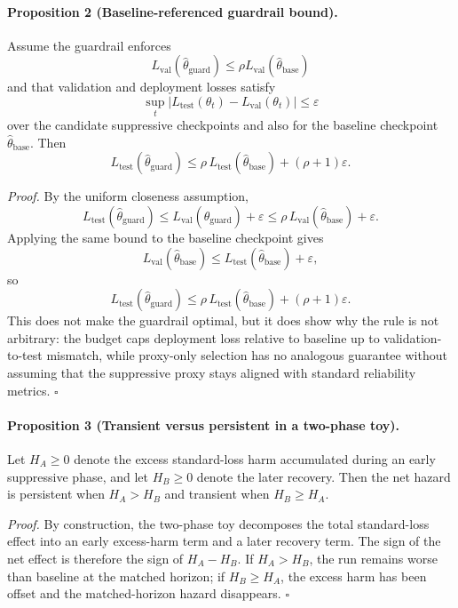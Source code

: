 \paragraph{Proposition 2 (Baseline-referenced guardrail bound).}
Assume the guardrail enforces
\[
L_{\mathrm{val}}(\hat\theta_{\mathrm{guard}}) \le \rho L_{\mathrm{val}}(\hat\theta_{\mathrm{base}})
\]
and that validation and deployment losses satisfy
\[
\sup_t \left|L_{\mathrm{test}}(\theta_t)-L_{\mathrm{val}}(\theta_t)\right| \le \varepsilon
\]
over the candidate suppressive checkpoints and also for the baseline checkpoint $\hat\theta_{\mathrm{base}}$.
Then
\[
L_{\mathrm{test}}(\hat\theta_{\mathrm{guard}})
\le
\rho\,L_{\mathrm{test}}(\hat\theta_{\mathrm{base}})
+
(\rho+1)\varepsilon.
\]

\emph{Proof.}
By the uniform closeness assumption,
\[
L_{\mathrm{test}}(\hat\theta_{\mathrm{guard}})
\le
L_{\mathrm{val}}(\hat\theta_{\mathrm{guard}})+\varepsilon
\le
\rho\,L_{\mathrm{val}}(\hat\theta_{\mathrm{base}})+\varepsilon.
\]
Applying the same bound to the baseline checkpoint gives
\[
L_{\mathrm{val}}(\hat\theta_{\mathrm{base}})
\le
L_{\mathrm{test}}(\hat\theta_{\mathrm{base}})+\varepsilon,
\]
so
\[
L_{\mathrm{test}}(\hat\theta_{\mathrm{guard}})
\le
\rho\,L_{\mathrm{test}}(\hat\theta_{\mathrm{base}})
+
(\rho+1)\varepsilon.
\]
This does not make the guardrail optimal, but it does show why the rule is not arbitrary: the budget caps deployment loss relative to baseline up to validation-to-test mismatch, while proxy-only selection has no analogous guarantee without assuming that the suppressive proxy stays aligned with standard reliability metrics.
\hfill$\square$

\paragraph{Proposition 3 (Transient versus persistent in a two-phase toy).}
Let $H_A\ge 0$ denote the excess standard-loss harm accumulated during an early suppressive phase, and let $H_B\ge 0$ denote the later recovery.
Then the net hazard is persistent when $H_A > H_B$ and transient when $H_B \ge H_A$.

\emph{Proof.}
By construction, the two-phase toy decomposes the total standard-loss effect into an early excess-harm term and a later recovery term.
The sign of the net effect is therefore the sign of $H_A-H_B$.
If $H_A > H_B$, the run remains worse than baseline at the matched horizon; if $H_B \ge H_A$, the excess harm has been offset and the matched-horizon hazard disappears.
\hfill$\square$

